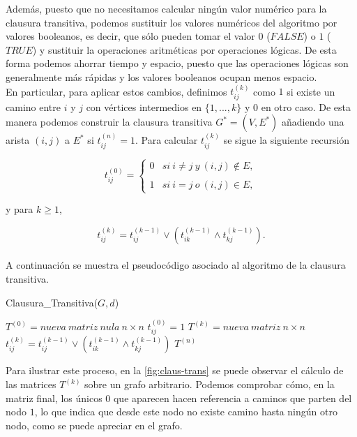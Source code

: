 Además, puesto que no necesitamos calcular ningún valor numérico para la clausura transitiva, podemos sustituir los valores numéricos del algoritmo por valores booleanos, es decir, que sólo pueden tomar el valor $0$ ($FALSE$) o $1$ ($TRUE$) y sustituir la operaciones aritméticas por operaciones lógicas. De esta forma podemos ahorrar tiempo y espacio, puesto que las operaciones lógicas son generalmente más rápidas y los valores booleanos ocupan menos espacio. \\

En particular, para aplicar estos cambios, definimos $t_{ij}^{(k)}$ como $1$ si existe un camino entre $i$ y $j$ con vértices intermedios en $\{1,...,k\}$ y $0$ en otro caso. De esta manera podemos construir la clausura transitiva $G^*=(V,E^*)$ añadiendo una arista $(i,j)$ a $E^*$ si $t_{ij}^{(n)}=1$. Para calcular $t_{ij}^{(k)}$ se sigue la siguiente recursión

$$t_{ij}^{(0)}= \left\{ \begin{array}{lcc}
	0 &   si\ i\neq j\ y\ (i,j)\notin E, \\
	\\ 1 & si\ i= j\ o\ (i,j)\in E,
\end{array}
\right.$$

y para $k\geq 1$,

$$t_{ij}^{(k)}=t_{ij}^{(k-1)}\lor (t_{ik}^{(k-1)}\wedge t_{kj}^{(k-1)}).$$ \\

A continuación se muestra el pseudocódigo asociado al algoritmo de la clausura transitiva.

\begin{breakablealgorithm}
	\caption{Clausura\_Transitiva($G,d$)}
	\begin{algorithmic}[1]
		\State $T^{(0)}=nueva\ matriz\ nula\ n\times n$
			\State $t_{ij}^{(0)}=1$
		\EndFor
			\State $T^{(k)}=nueva\ matriz\ n\times n$
					\State $t_{ij}^{(k)}=t_{ij}^{(k-1)}\lor (t_{ik}^{(k-1)}\wedge t_{kj}^{(k-1)})$
				\EndFor
			\EndFor
		\EndFor
		\Return $T^{(n)}$
	\end{algorithmic}
\end{breakablealgorithm}

Para ilustrar este proceso, en la \autoref{fig:claus-trans} se puede observar el cálculo de las matrices $T^{(k)}$ sobre un grafo arbitrario. Podemos comprobar cómo, en la matriz final, los únicos $0$ que aparecen hacen referencia a caminos que parten del nodo $1$, lo que indica que desde este nodo no existe camino hasta ningún otro nodo, como se puede apreciar en el grafo.



\endinput



